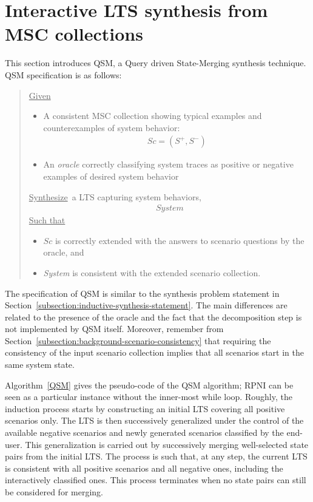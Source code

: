 \section{Interactive LTS synthesis from MSC collections\label{section:lts-induction-from-mscs}}

This section introduces QSM, a Query driven State-Merging synthesis technique. QSM specification is as follows:

\begin{quote}
\underline{Given}
\begin{itemize}
\item A consistent MSC collection showing typical examples and counterexamples of system behavior:
\begin{align*}Sc = (S^+,S^-)\end{align*}
\item An \emph{oracle} correctly classifying system traces as positive or negative examples of desired system behavior
\end{itemize}
\underline{Synthesize}~a LTS capturing system behaviors,
\begin{align*}System\end{align*}
\underline{Such that}
\begin{itemize}
\item $Sc$ is correctly extended with the answers to scenario questions by the oracle, and
\item \emph{System} is consistent with the extended scenario collection.
\end{itemize}
\end{quote}

The specification of QSM is similar to the synthesis problem statement in Section~\ref{subsection:inductive-synthesis-statement}. The main differences are related to the presence of the oracle and the fact that the decomposition step is not implemented by QSM itself. Moreover, remember from Section~\ref{subsection:background-scenario-consistency} that requiring the consistency of the input scenario collection implies that all scenarios start in the same system state.

Algorithm~\ref{QSM} gives the pseudo-code of the \textsc{QSM} algorithm; RPNI can be seen as a particular instance without the inner-most while loop. Roughly, the induction process starts by constructing an initial LTS covering all positive scenarios only. The LTS is then successively generalized under the control of the available negative scenarios and newly generated scenarios classified by the end-user. This generalization is carried out by successively merging well-selected state pairs from the initial LTS. The process is such that, at any step, the current LTS is consistent with all positive scenarios and all negative ones, including the interactively classified ones. This process terminates when no state pairs can still be considered for merging.

